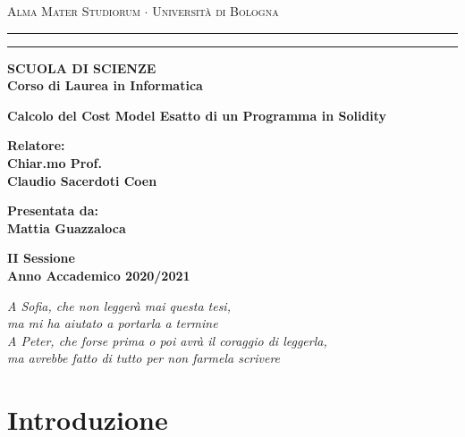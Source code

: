 \documentclass[12pt,a4paper,openright,oneside]{report}
\theoremstyle{definition}
\begin{document}
\begin{titlepage}
\begin{center}
{{\Large{\textsc{Alma Mater Studiorum $\cdot$ Universit\`a di
Bologna}}}} \rule[0.1cm]{15.8cm}{0.1mm}
\rule[0.5cm]{15.8cm}{0.6mm}
{\small{\bf SCUOLA DI SCIENZE\\
Corso di Laurea in Informatica}}
\end{center}
\vspace{15mm}
\begin{center}
{\LARGE{\bf Calcolo del Cost Model Esatto di un Programma in Solidity}}\\
\vspace{3mm}
\end{center}
\vspace{40mm}
\par
\noindent
\begin{minipage}[t]{0.47\textwidth}
{\large{\bf Relatore:\\
Chiar.mo Prof.\\
Claudio Sacerdoti Coen}}
\end{minipage}
\hfill
\begin{minipage}[t]{0.47\textwidth}\raggedleft
{\large{\bf Presentata da:\\
Mattia Guazzaloca}}
\end{minipage}
\vspace{40mm}
\begin{center}
{\large{\bf II Sessione\\
Anno Accademico 2020/2021}}
\end{center}
\end{titlepage}

\begin{titlepage}
\thispagestyle{empty}
\topmargin=6.5cm
\raggedleft
\large

\em
A Sofia, che non legger\`{a} mai questa tesi, \\ma mi ha aiutato a portarla a termine \\
\hfill \break
A Peter, che forse prima o poi avr\`{a} il coraggio di leggerla, \\ma avrebbe fatto di tutto per non farmela scrivere
\newpage
\clearpage{\pagestyle{empty}\cleardoublepage}
\end{titlepage}

\chapter*{Introduzione}
                                        
\end{document}
